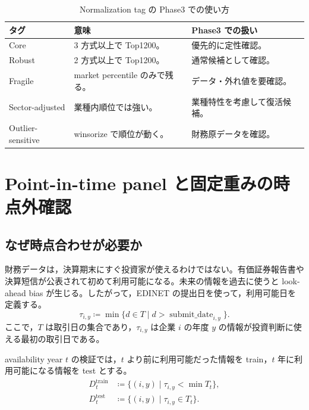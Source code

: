 \documentclass[a4paper,10pt]{article}
\newcommand{\smalltable}{\fontsize{8.7pt}{11pt}\selectfont}
\begin{document}
\begin{table}[H]
\caption{Normalization tag の Phase3 での使い方}
\centering\smalltable
\begin{tabularx}{\linewidth}{p{36mm}YY}
\toprule
タグ & 意味 & Phase3 での扱い \\
\midrule
Core & 3 方式以上で Top1200。 & 優先的に定性確認。 \\
Robust & 2 方式以上で Top1200。 & 通常候補として確認。 \\
Fragile & market percentile のみで残る。 & データ・外れ値を要確認。 \\
Sector-adjusted & 業種内順位では強い。 & 業種特性を考慮して復活候補。 \\
Outlier-sensitive & winsorize で順位が動く。 & 財務原データを確認。 \\
\bottomrule
\end{tabularx}
\end{table}

\section{Point-in-time panel と固定重みの時点外確認}

\subsection{なぜ時点合わせが必要か}
財務データは，決算期末にすぐ投資家が使えるわけではない。有価証券報告書や決算短信が公表されて初めて利用可能になる。未来の情報を過去に使うと look-ahead bias が生じる。したがって，EDINET の提出日を使って，利用可能日を定義する。
\begin{equation}
\tau_{i,y} \coloneqq \min\{d\in T \mid d>\operatorname{submit\_date}_{i,y}\} .
\end{equation}
ここで，$T$ は取引日の集合であり，$\tau_{i,y}$ は企業 $i$ の年度 $y$ の情報が投資判断に使える最初の取引日である。

availability year $t$ の検証では，$t$ より前に利用可能だった情報を train，$t$ 年に利用可能になる情報を test とする。
\begin{align}
D^{\mathrm{train}}_t &\coloneqq \{(i,y) \mid \tau_{i,y}<\min T_t\}, \\
D^{\mathrm{test}}_t &\coloneqq \{(i,y) \mid \tau_{i,y}\in T_t\} .
\end{align}
\end{document}
